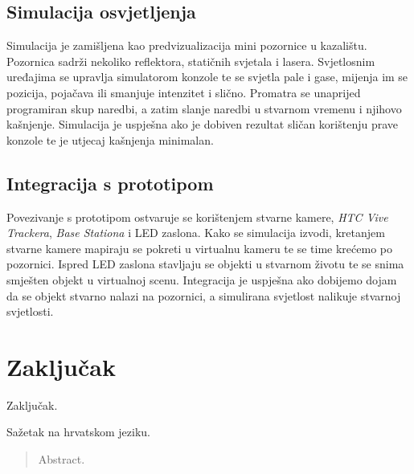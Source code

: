 \documentclass[times, utf8, zavrsni, numeric]{fer}
\begin{document}
\section{Simulacija osvjetljenja}
Simulacija je zamišljena kao predvizualizacija mini pozornice u kazalištu. Pozornica sadrži nekoliko reflektora, statičnih svjetala i lasera. Svjetlosnim uređajima se upravlja simulatorom konzole te se svjetla pale i gase, mijenja im se pozicija, pojačava ili smanjuje intenzitet i slično. Promatra se unaprijed programiran skup naredbi, a zatim slanje naredbi u stvarnom vremenu i njihovo kašnjenje. Simulacija je uspješna ako je dobiven rezultat sličan korištenju prave konzole te je utjecaj kašnjenja minimalan.

\pagebreak

\section{Integracija s prototipom}
Povezivanje s prototipom ostvaruje se korištenjem stvarne kamere, \emph{HTC Vive Trackera}, \emph{Base Stationa} i LED zaslona. Kako se simulacija izvodi, kretanjem stvarne kamere mapiraju se pokreti u virtualnu kameru te se time krećemo po pozornici. Ispred LED zaslona stavljaju se objekti u stvarnom životu te se snima smješten objekt u virtualnoj scenu. Integracija je uspješna ako dobijemo dojam da se objekt stvarno nalazi na pozornici, a simulirana svjetlost nalikuje stvarnoj svjetlosti.

\chapter{Zaključak}
Zaključak.

\raggedright



\begin{sazetak}
Sažetak na hrvatskom jeziku.

\end{sazetak}

\begin{abstract}
Abstract.

\end{abstract}
\end{document}
